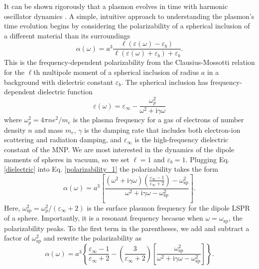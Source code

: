 \documentclass [11pt, proquest] {uwthesis}[2016/11/22]
\begin{document}
It can be shown rigorously that a plasmon evolves in time with harmonic oscillator dynamics \cite{KREIBIG1985,ARPC}. A simple, intuitive approach to understanding the plasmon's time evolution begins by considering the polarizability of a spherical inclusion of a different material than its surroundings
\begin{equation}
\alpha(\omega) = a^3\frac{\ell(\varepsilon(\omega)-\varepsilon_b)}{\ell(\varepsilon(\omega)+\varepsilon_b)+\varepsilon_b}.
\label{polarizability_1}
\end{equation}
This is the frequency-dependent polarizability from the Clausius-Mossotti relation \cite{Clausius} for the $\ell$th multipole moment of a spherical inclusion of radius $a$ in a background with dielectric constant $\varepsilon_b$.  The spherical inclusion has frequency-dependent dielectric function 
\begin{equation}
\varepsilon(\omega) = \varepsilon_{\infty} - \frac{\omega_p^2}{\omega^2+\textrm{i}\gamma\omega}
\label{dielectric}
\end{equation}
where $\omega_p^2 = 4\pi ne^2/m_e$ is the plasma frequency for a gas of electrons of number density $n$ and mass $m_e$, $\gamma$ is the damping rate that includes both electron-ion scattering and radiation damping, and $\varepsilon_{\infty}$ is the high-frequency dielectric constant of the MNP. We are most interested in the dynamics of the dipole moments of spheres in vacuum, so we set $\ell = 1$ and $\varepsilon_b = 1$. Plugging Eq. \ref{dielectric} into Eq. \ref{polarizability_1} the polarizability takes the form
\begin{equation}
\alpha(\omega) = a^3\left[\frac{\left(\omega^2+\textrm{i}\gamma\omega\right)\left(\frac{\varepsilon_{\infty}-1}{\varepsilon_{\infty}+2}\right)-\omega_{\textrm{sp}}^2}{\omega^2+\textrm{i}\gamma\omega-\omega_{\textrm{sp}}^2}\right].
\label{polarizability_2}
\end{equation}
Here, $\omega_{\textrm{sp}}^2 = \omega_p^2/(\varepsilon_{\infty}+2)$ is the surface plasmon frequency for the dipole LSPR of a sphere. Importantly, it is a resonant frequency becasue when $\omega=\omega_{\textrm{sp}}$, the polarizability peaks. To the first term in the parentheses, we add and subtract a factor of $\omega_{\textrm{sp}}^2$ and rewrite the polarizability as
\begin{equation}
\alpha(\omega) = a^3\left\{\frac{\varepsilon_{\infty}-1}{\varepsilon_{\infty}+2} -\left(\frac{3}{\varepsilon_{\infty}+2}\right)\left[\frac{\omega_{\textrm{sp}}^2}{\omega^2+\textrm{i}\gamma\omega-\omega_{\textrm{sp}}^2}\right]\right\}.
\label{polarizability_3}
\end{equation}
\end{document}
